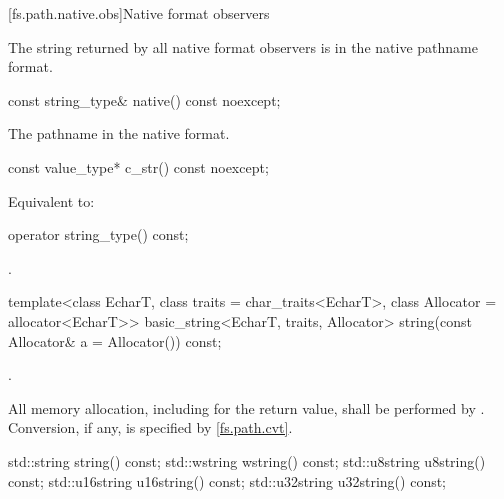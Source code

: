 [fs.path.native.obs]{Native format observers}

\pnum
The string returned by all native format observers is in the native pathname format.

%
\begin{itemdecl}
const string_type& native() const noexcept;
\end{itemdecl}

\begin{itemdescr}
\pnum
\returns
The pathname in the native format.
\end{itemdescr}

%
\begin{itemdecl}
const value_type* c_str() const noexcept;
\end{itemdecl}

\begin{itemdescr}
\pnum
\effects
Equivalent to: 
\end{itemdescr}

%
\begin{itemdecl}
operator string_type() const;
\end{itemdecl}

\begin{itemdescr}
\pnum
\returns
{}.
\end{itemdescr}

%
\begin{itemdecl}
template<class EcharT, class traits = char_traits<EcharT>,
         class Allocator = allocator<EcharT>>
  basic_string<EcharT, traits, Allocator>
    string(const Allocator& a = Allocator()) const;
\end{itemdecl}

\begin{itemdescr}
\pnum
\returns
{}.

\pnum
\remarks
All memory allocation, including for the return value, shall
be performed by . Conversion, if any, is specified by
\ref{fs.path.cvt}.
\end{itemdescr}

%
%
%
%
%
\begin{itemdecl}
std::string string() const;
std::wstring wstring() const;
std::u8string u8string() const;
std::u16string u16string() const;
std::u32string u32string() const;
\end{itemdecl}

